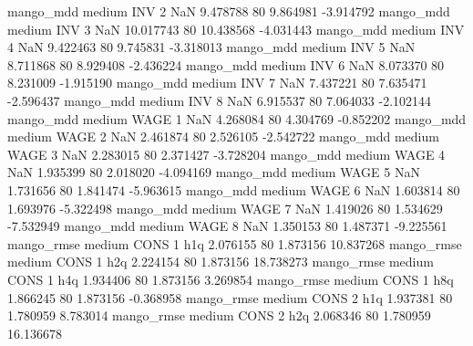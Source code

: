         mango_mdd     medium      INV                 2                  NaN  9.478788 80       9.864981          -3.914792
        mango_mdd     medium      INV                 3                  NaN 10.017743 80      10.438568          -4.031443
        mango_mdd     medium      INV                 4                  NaN  9.422463 80       9.745831          -3.318013
        mango_mdd     medium      INV                 5                  NaN  8.711868 80       8.929408          -2.436224
        mango_mdd     medium      INV                 6                  NaN  8.073370 80       8.231009          -1.915190
        mango_mdd     medium      INV                 7                  NaN  7.437221 80       7.635471          -2.596437
        mango_mdd     medium      INV                 8                  NaN  6.915537 80       7.064033          -2.102144
        mango_mdd     medium     WAGE                 1                  NaN  4.268084 80       4.304769          -0.852202
        mango_mdd     medium     WAGE                 2                  NaN  2.461874 80       2.526105          -2.542722
        mango_mdd     medium     WAGE                 3                  NaN  2.283015 80       2.371427          -3.728204
        mango_mdd     medium     WAGE                 4                  NaN  1.935399 80       2.018020          -4.094169
        mango_mdd     medium     WAGE                 5                  NaN  1.731656 80       1.841474          -5.963615
        mango_mdd     medium     WAGE                 6                  NaN  1.603814 80       1.693976          -5.322498
        mango_mdd     medium     WAGE                 7                  NaN  1.419026 80       1.534629          -7.532949
        mango_mdd     medium     WAGE                 8                  NaN  1.350153 80       1.487371          -9.225561
       mango_rmse     medium     CONS                 1                  h1q  2.076155 80       1.873156          10.837268
       mango_rmse     medium     CONS                 1                  h2q  2.224154 80       1.873156          18.738273
       mango_rmse     medium     CONS                 1                  h4q  1.934406 80       1.873156           3.269854
       mango_rmse     medium     CONS                 1                  h8q  1.866245 80       1.873156          -0.368958
       mango_rmse     medium     CONS                 2                  h1q  1.937381 80       1.780959           8.783014
       mango_rmse     medium     CONS                 2                  h2q  2.068346 80       1.780959          16.136678
